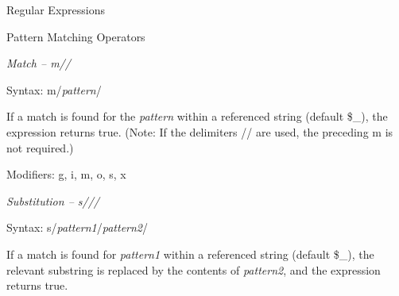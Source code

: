 \documentclass[a4paper,11pt]{book}
\begin{document}

\noindent 

\noindent 

\noindent 

\noindent 

\noindent  

\noindent  

\noindent  

\noindent  

\noindent 

\noindent 

\noindent 

\noindent 

\noindent 

\noindent 

\noindent 

\noindent 

\noindent 

\noindent 

\noindent 

\noindent Regular Expressions

\noindent 

\noindent 

\noindent 

\noindent 

\noindent 

\noindent 

\noindent Pattern Matching Operators

\noindent 

\noindent 

\noindent \textit{Match -- m//}

\noindent Syntax: m/\textit{pattern}/

\noindent 

\noindent If a match is found for the \textit{pattern }within a referenced string (default \$\_), the expression returns true. (Note: If the delimiters // are used, the preceding m is not required.)

\noindent 

\noindent Modifiers: g, i, m, o, s, x

\noindent 

\noindent \textit{Substitution -- s///}

\noindent Syntax: s/\textit{pattern1}/\textit{pattern2}/

\noindent 

\noindent If a match is found for \textit{pattern1 }within a referenced string (default \$\_), the relevant substring is replaced by the contents of \textit{pattern2}, and the expression returns true.
\end{document}
